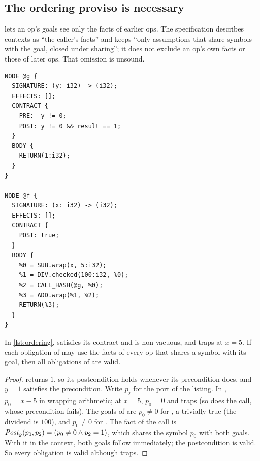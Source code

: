 \subsection{The ordering proviso is necessary}

 lets an op's goals see only the facts of earlier ops. The specification
describes contexts as ``the caller's facts'' and keeps ``only assumptions that share symbols
with the goal, closed under sharing''; it does not exclude an op's own facts or those of later
ops. That omission is unsound.

\begin{lstlisting}[float=t,caption={A program that traps at $x=5$ but whose obligations all
become valid if contexts may contain an op's own facts.},label=lst:ordering]
NODE @g {
  SIGNATURE: (y: i32) -> (i32);
  EFFECTS: [];
  CONTRACT {
    PRE:  y != 0;
    POST: y != 0 && result == 1;
  }
  BODY {
    RETURN(1:i32);
  }
}

NODE @f {
  SIGNATURE: (x: i32) -> (i32);
  EFFECTS: [];
  CONTRACT {
    POST: true;
  }
  BODY {
    %0 = SUB.wrap(x, 5:i32);
    %1 = DIV.checked(100:i32, %0);
    %2 = CALL_HASH(@g, %0);
    %3 = ADD.wrap(%1, %2);
    RETURN(%3);
  }
}
\end{lstlisting}

\begin{proposition}\label{prop:ordering-needed}
In \cref{lst:ordering},  satisfies its contract and is non-vacuous, and  traps at
$x=5$. If each obligation of  may use the facts of every op that shares a symbol with
its goal, then all obligations of  are valid.
\end{proposition}
\begin{proof}
 returns $1$, so its postcondition holds whenever its precondition does, and $y=1$
satisfies the precondition. Write $p_j$ for the port  of the listing. In ,
$p_0=x-5$ in wrapping  arithmetic; at $x=5$,
$p_0=0$ and  traps (so does the call, whose precondition fails). The goals of
 are $p_0\neq0$ for , a trivially true  (the
dividend is $100$), and $p_0\neq0$ for . The fact of the call is
$\mathit{Post}_g(p_0,p_2)=(p_0\neq0\wedge p_2=1)$, which shares the symbol $p_0$ with both goals. With it in
the context, both goals follow immediately; the postcondition  is valid. So every
obligation is valid although  traps.
\end{proof}

